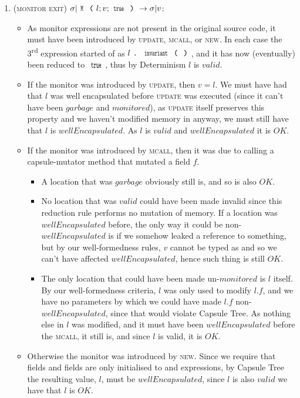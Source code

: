 \begin{enumerate}
\item (\textsc{monitor exit}) $\sigma|\Kw{M}\oR l; v;\Kw{true}\cR\rightarrow \sigma|v$:
\begin{itemize}
	\item As monitor expressions are not present in the original source code, it must have been introduced by \textsc{update}, \textsc{mcall}, or \textsc{new}. In each case the 3\textsuperscript{rd} expression started of as $l\singleDot\Kw{invariant}\oR\cR$, and it has now (eventually) been reduced to $\Kw{true}$, thus by Determinism $l$ is $valid$.

	\item  If the monitor was introduced by \textsc{update}, then $v = l$. We must have had that $l$ was well encapsulated before \textsc{update} was executed (since it can’t have been $garbage$ and $monitored$), as \textsc{update} itself preserves this property and we haven’t modified memory in anyway, we must still have that $l$ is $wellEncapsulated$. As $l$ is $valid$ and $wellEncapsulated$ it is $OK$.

	\item If the monitor was introduced by \textsc{mcall}, then it was due to calling a capsule-mutator method that mutated a field $f$.
	\begin{itemize}
		\item A location that was $garbage$ obviously still is, and so is also $OK$.
		\item No location that was $valid$ could have been made invalid since this reduction rule performs no mutation of memory. If a location was $wellEncapsulated$ before, the only way it could be non-$wellEncapsulated$ is if we somehow leaked a \Q@mut@ reference to something, but by our well-formedness rules, $v$ cannot be typed as \Q@mut@ and so we can’t have affected $wellEncapsulated$, hence such thing is still $OK$.
		\item The only location that could have been made un-$monitored$ is $l$ itself. By our well-formedness criteria, $l$ was only used to modify $l.f$, and we have no parameters by which we could have made $l.f$ non-$wellEncapsulated$, since that would violate Capsule Tree. As nothing else in $l$ was modified, and it must have been $wellEncapsulated$ before the \textsc{mcall}, it still is, and since  $l$ is valid, it is $OK$.
	\end{itemize}
	\item Otherwise the monitor was introduced by \textsc{new}. Since we require that \Q@capsule@ fields and \Q@imm@ fields are only initialised to \Q@capsule@ and \Q@imm@ expressions, by Capsule Tree the resulting value, $l$, must be $wellEncapsulated$, since $l$ is also $valid$ we have that $l$ is $OK$.


\end{itemize}
\end{enumerate}

